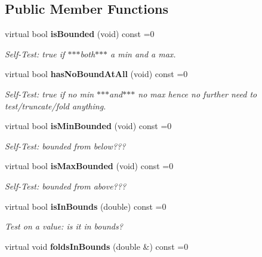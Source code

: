 \subsection*{Public Member Functions}
\begin{CompactItemize}
\item 
virtual bool {\bf is\-Bounded} (void) const =0\label{classeo_real_bounds_a1}

\begin{CompactList}\small\item\em Self-Test: true if $\ast$$\ast$$\ast$both$\ast$$\ast$$\ast$ a min and a max. \item\end{CompactList}\item 
virtual bool {\bf has\-No\-Bound\-At\-All} (void) const =0\label{classeo_real_bounds_a2}

\begin{CompactList}\small\item\em Self-Test: true if no min $\ast$$\ast$$\ast$and$\ast$$\ast$$\ast$ no max hence no further need to test/truncate/fold anything. \item\end{CompactList}\item 
virtual bool {\bf is\-Min\-Bounded} (void) const =0\label{classeo_real_bounds_a3}

\begin{CompactList}\small\item\em Self-Test: bounded from below??? \item\end{CompactList}\item 
virtual bool {\bf is\-Max\-Bounded} (void) const =0\label{classeo_real_bounds_a4}

\begin{CompactList}\small\item\em Self-Test: bounded from above??? \item\end{CompactList}\item 
virtual bool {\bf is\-In\-Bounds} (double) const =0\label{classeo_real_bounds_a5}

\begin{CompactList}\small\item\em Test on a value: is it in bounds? \item\end{CompactList}\item 
virtual void {\bf folds\-In\-Bounds} (double \&) const =0\label{classeo_real_bounds_a6}


\end{CompactItemize}

